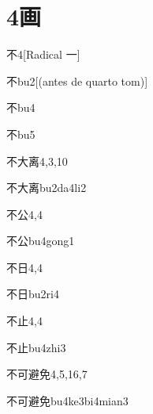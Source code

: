
\section*{4画}

\begin{entry}{不}{4}[Radical 一]
  \begin{phonetics}{不}{bu2}[(antes de quarto tom)]
  \end{phonetics}
  \begin{phonetics}{不}{bu4}
  \end{phonetics}
  \begin{phonetics}{不}{bu5}
  \end{phonetics}
\end{entry}

\begin{entry}{不大离}{4,3,10}
  \begin{phonetics}{不大离}{bu2da4li2}
  \end{phonetics}
\end{entry}

\begin{entry}{不公}{4,4}
  \begin{phonetics}{不公}{bu4gong1}
  \end{phonetics}
\end{entry}

\begin{entry}{不日}{4,4}
  \begin{phonetics}{不日}{bu2ri4}
  \end{phonetics}
\end{entry}

\begin{entry}{不止}{4,4}
  \begin{phonetics}{不止}{bu4zhi3}
  \end{phonetics}
\end{entry}

\begin{entry}{不可避免}{4,5,16,7}
  \begin{phonetics}{不可避免}{bu4ke3bi4mian3}
  \end{phonetics}
\end{entry}

